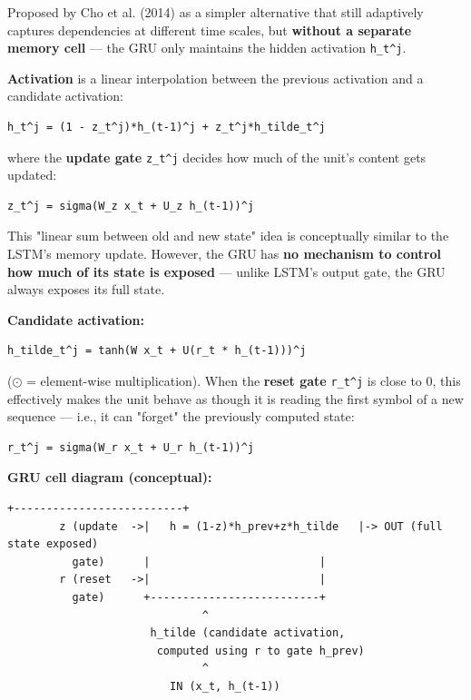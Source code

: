 \documentclass[12pt,openany]{book}
\theoremstyle{definition}
\theoremstyle{remark}
\begin{document}
Proposed by Cho et al. (2014) as a simpler alternative that still adaptively captures dependencies at different time scales, but \textbf{without a separate memory cell} --- the GRU only maintains the hidden activation \texttt{h\_t\textasciicircum{}j}.

\textbf{Activation} is a linear interpolation between the previous activation and a candidate activation:

\begin{lstlisting}[style=notesCode]
h_t^j = (1 - z_t^j)*h_(t-1)^j + z_t^j*h_tilde_t^j
\end{lstlisting}

where the \textbf{update gate} \texttt{z\_t\textasciicircum{}j} decides how much of the unit's content gets updated:

\begin{lstlisting}[style=notesCode]
z_t^j = sigma(W_z x_t + U_z h_(t-1))^j
\end{lstlisting}

This "linear sum between old and new state" idea is conceptually similar to the LSTM's memory update. However, the GRU has \textbf{no mechanism to control how much of its state is exposed} --- unlike LSTM's output gate, the GRU always exposes its full state.

\textbf{Candidate activation:}

\begin{lstlisting}[style=notesCode]
h_tilde_t^j = tanh(W x_t + U(r_t * h_(t-1)))^j
\end{lstlisting}

(\texttt{\ensuremath{\odot}} = element-wise multiplication). When the \textbf{reset gate} \texttt{r\_t\textasciicircum{}j} is close to 0, this effectively makes the unit behave as though it is reading the first symbol of a new sequence --- i.e., it can "forget" the previously computed state:

\begin{lstlisting}[style=notesCode]
r_t^j = sigma(W_r x_t + U_r h_(t-1))^j
\end{lstlisting}

\textbf{GRU cell diagram (conceptual):}

\begin{lstlisting}[style=notesCode]
                    +--------------------------+
        z (update  ->|   h = (1-z)*h_prev+z*h_tilde   |-> OUT (full state exposed)
          gate)      |                          |
        r (reset   ->|                          |
          gate)      +--------------------------+
                              ^
                      h_tilde (candidate activation,
                       computed using r to gate h_prev)
                              ^
                         IN (x_t, h_(t-1))
\end{lstlisting}
\end{document}
